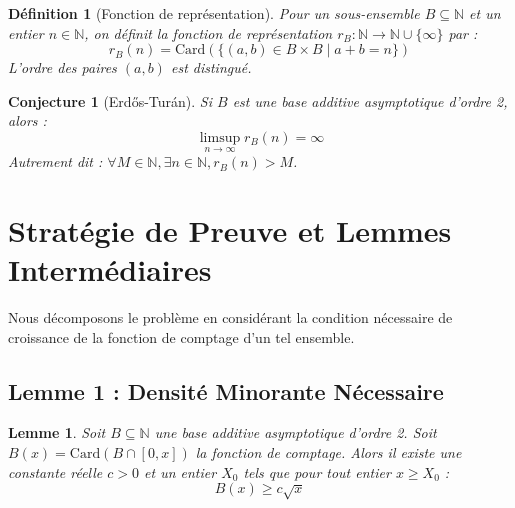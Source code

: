 \documentclass[12pt,a4paper]{article}
\newtheorem{lemma}[theorem]{Lemme}
\newtheorem{definition}[theorem]{Définition}
\newtheorem{conjecture}[theorem]{Conjecture}
\begin{document}
\begin{definition}[Fonction de représentation]
Pour un sous-ensemble $B \subseteq \mathbb{N}$ et un entier $n \in \mathbb{N}$, on définit la fonction de représentation $r_B : \mathbb{N} \to \mathbb{N} \cup \{\infty\}$ par :
$$r_B(n) = \mathrm{Card}\left(\{(a, b) \in B \times B \mid a + b = n\}\right)$$
L'ordre des paires $(a, b)$ est distingué.
\end{definition}

\begin{conjecture}[Erdős-Turán]
Si $B$ est une base additive asymptotique d'ordre 2, alors :
$$\limsup_{n \to \infty} r_B(n) = \infty$$
Autrement dit : $\forall M \in \mathbb{N}, \exists n \in \mathbb{N}, r_B(n) > M$.
\end{conjecture}

\section{Stratégie de Preuve et Lemmes Intermédiaires}

Nous décomposons le problème en considérant la condition nécessaire de croissance de la fonction de comptage d'un tel ensemble.

\subsection{Lemme 1 : Densité Minorante Nécessaire}
\begin{lemma}
Soit $B \subseteq \mathbb{N}$ une base additive asymptotique d'ordre 2. Soit $B(x) = \mathrm{Card}(B \cap [0, x])$ la fonction de comptage. Alors il existe une constante réelle $c > 0$ et un entier $X_0$ tels que pour tout entier $x \ge X_0$ :
$$B(x) \ge c \sqrt{x}$$
\end{lemma}
\end{document}
